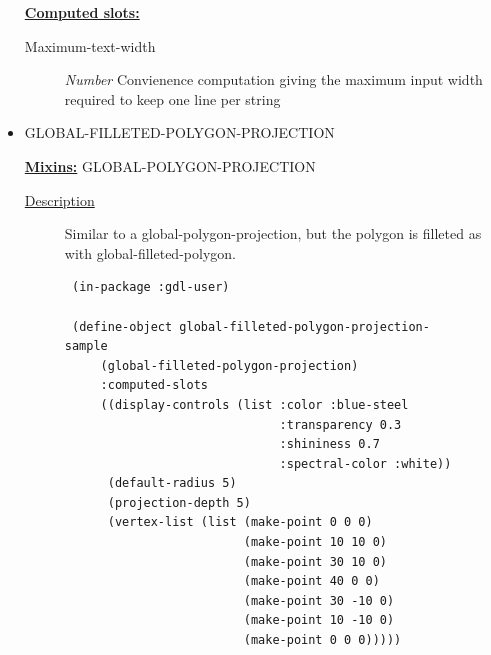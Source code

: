 \documentclass [11pt]{book}
\begin{document}
\begin{itemize}
\begin{description}
\end{description}






\textbf{
\underline{Computed slots:}}

\begin{description}

\item [Maximum-text-width]
\emph{Number} Convienence computation giving the maximum input width required to keep one line per string


\end{description}







\item {}GLOBAL-FILLETED-POLYGON-PROJECTION


\textbf{
\underline{Mixins:}} GLOBAL-POLYGON-PROJECTION





\begin{description}

\item [
\underline{Description}]


Similar to a global-polygon-projection, but the polygon is filleted
as with global-filleted-polygon.



\end{description}




\begin{figure}
\begin{lrbox}{\boxedverb}
\begin{minipage}{\linewidth}
{\small

\begin{verbatim}
 (in-package :gdl-user)

 (define-object global-filleted-polygon-projection-sample 
     (global-filleted-polygon-projection)
     :computed-slots
     ((display-controls (list :color :blue-steel 
                              :transparency 0.3 
                              :shininess 0.7 
                              :spectral-color :white))
      (default-radius 5)
      (projection-depth 5)
      (vertex-list (list (make-point 0 0 0)
                         (make-point 10 10 0)
                         (make-point 30 10 0)
                         (make-point 40 0 0)
                         (make-point 30 -10 0)
                         (make-point 10 -10 0)
                         (make-point 0 0 0)))))


\end{verbatim}}
\end{minipage}
\end{lrbox}
\end{figure}
\end{itemize}
\end{document}
